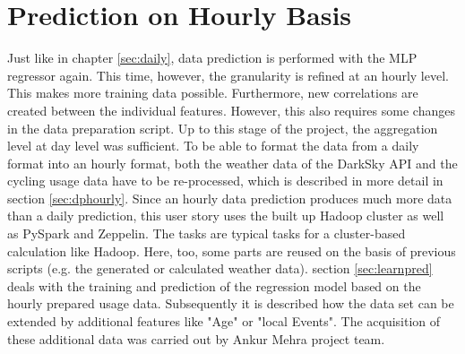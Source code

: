 
\section{Prediction on Hourly Basis}
Just like in chapter \ref{sec:daily}, data prediction is performed with the MLP regressor again. This time, however, the granularity is refined at an hourly level. This makes more training data possible. Furthermore, new correlations are created between the individual features. However, this also requires some changes in the data preparation script. Up to this stage of the project, the aggregation level at day level was sufficient. To be able to format the data from a daily format into an hourly format, both the weather data of the DarkSky API and the cycling usage data have to be re-processed, which is described in more detail in section \ref{sec:dphourly}.
Since an hourly data prediction produces much more data than a daily prediction, this user story uses the built up Hadoop cluster as well as PySpark and Zeppelin. The tasks are typical tasks for a cluster-based calculation like Hadoop. Here, too, some parts are reused on the basis of previous scripts (e.g. the generated or calculated weather data).
section \ref{sec:learnpred} deals with the training and prediction of the regression model based on the hourly prepared usage data. Subsequently it is described how the data set can be extended by additional features like "Age" or "local Events". The acquisition of these additional data was carried out by Ankur Mehra project team. 

